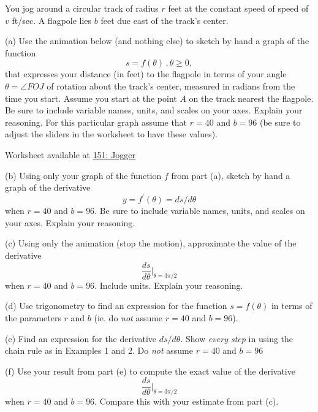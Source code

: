 \documentclass{ximera}
\begin{document}
\begin{exercise}  \label{Ex:dsfthdsfdsfmmm}
You jog around a circular track of radius $r$ feet at the constant speed of speed of $v$ ft/sec. A flagpole lies $b$ feet due east of the track's center.

(a) Use the animation below (and nothing else) to sketch by hand a graph of the function 
\[
   s = f(\theta) \, , \theta \geq 0,
\]
that expresses your distance (in feet) to the flagpole in terms of your angle $\theta = \angle FOJ$ of rotation about the track's center, measured in radians from the time you start. Assume you start at the point $A$ on the track nearest the flagpole. Be sure to include variable names, units, and scales on your axes. Explain your reasoning. For this particular graph assume that $r=40$ and $b=96$ (be sure to adjust the sliders in the worksheet to have these values).

\begin{onlineOnly}
    \begin{center}
\end{center}
\end{onlineOnly}

Worksheet available at \href{https://www.desmos.com/calculator/4pndurvhdd}{151: Jogger}

(b) Using only your graph of the function $f$ from part (a), sketch by hand a graph of the derivative
\[
    y = f^\prime(\theta) = ds/d\theta
\]
when $r=40$ and $b=96$. Be sure to include variable names, units, and scales on your axes. Explain your reasoning.

(c) Using only the animation (stop the motion), approximate the value of the derivative
\[
     \frac{ds}{d\theta} \Big|_{\theta = 3\pi/2} 
\]
when $r=40$ and $b=96$. Include units. Explain your reasoning.

(d) Use trigonometry to find an expression for the function $s=f(\theta)$ in terms of the parameters $r$ and $b$ (ie. do \emph{not} assume $r=40$ and $b=96$).

(e) Find an expression for the derivative $ds/d\theta$. Show \emph{every step} in using the chain rule as in Examples 1 and 2. Do \emph{not} assume $r=40$ and $b=96$ %

(f) Use your result from part (e) to compute the exact value of the derivative
\[
     \frac{ds}{d\theta} \Big|_{\theta = 3\pi/2}  
\]
when $r=40$ and $b=96$. Compare this with your estimate from part (c).


\end{exercise}
\end{document}
